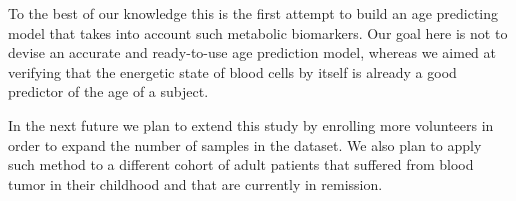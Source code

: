 To the best of our knowledge this is the first attempt to build an age predicting model that takes into account such metabolic biomarkers.
Our goal here is not to devise an accurate and ready-to-use age prediction model, whereas we aimed at verifying that the energetic state of blood cells by itself is already a good predictor of the age of a subject.

In the next future we plan to extend this study by enrolling more volunteers in order to expand the number of samples in the dataset.
We also plan to apply such method to a different cohort of adult patients that suffered from blood tumor in their childhood and that are currently in remission.



























